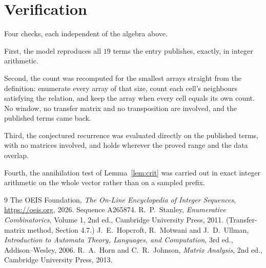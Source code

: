 \documentclass[11pt,a4paper]{article}
\theoremstyle{plain}
\theoremstyle{definition}
\begin{document}
\section{Verification}

Four checks, each independent of the algebra above.

First, the model reproduces all $19$ terms the entry publishes, exactly, in integer
arithmetic.

Second, the count was recomputed for the smallest arrays straight from the definition:
enumerate every array of that size, count each cell's neighbours satisfying the relation, and
keep the array when every cell equals its own count. No window, no transfer matrix and no
transposition are involved, and the published terms came back.

Third, the conjectured recurrence was evaluated directly on the published terms, with no
matrices involved, and holds wherever the proved range and the data overlap.

Fourth, the annihilation test of Lemma~\ref{lem:crit} was carried out in exact integer
arithmetic on the whole vector rather than on a sampled prefix.

\begin{thebibliography}{9}
 The OEIS Foundation, \emph{The On-Line Encyclopedia of Integer
Sequences}, \url{https://oeis.org}, 2026. Sequence A265874.
 R.~P.~Stanley, \emph{Enumerative Combinatorics}, Volume 1, 2nd ed.,
Cambridge University Press, 2011. (Transfer-matrix method, Section 4.7.)
 J.~E.~Hopcroft, R.~Motwani and J.~D.~Ullman, \emph{Introduction to Automata
Theory, Languages, and Computation}, 3rd ed., Addison--Wesley, 2006.
 R.~A.~Horn and C.~R.~Johnson, \emph{Matrix Analysis}, 2nd ed., Cambridge
University Press, 2013.
\end{thebibliography}
\end{document}
